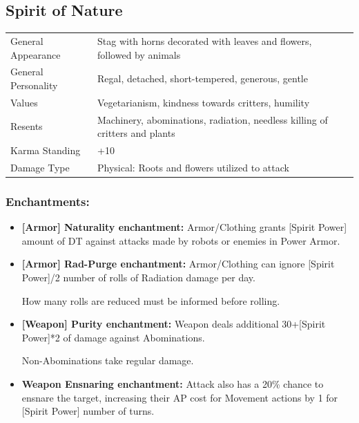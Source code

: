 \documentclass[11pt,a4paper,twocolumn]{book}
\begin{document}
\subsection*{Spirit of Nature}
{
	\begin{tabu} to 75mm{| X[l,4] | X[l,8] |}
		\hline
		General Appearance		& Stag with horns decorated with leaves and flowers, followed by animals		\\
        General Personality	   	& Regal, detached, short-tempered, generous, gentle								\\
        Values     				& Vegetarianism, kindness towards critters, humility							\\
        Resents     			& Machinery, abominations, radiation, needless killing of critters and plants 	\\
        Karma Standing      	& +10																			\\
        Damage Type 			& Physical: Roots and flowers utilized to attack	 							\\ \hline
	\end{tabu}
		
}

\medskip
\subsubsection*{Enchantments:}

\begin{itemize}
	\item \textbf{ [Armor] Naturality enchantment:} Armor/Clothing grants [Spirit Power] amount of DT against attacks made by robots or enemies in Power Armor.
	
    \item \textbf{ [Armor] Rad-Purge enchantment:} Armor/Clothing can ignore [Spirit Power]/2 number of rolls of Radiation damage per day. 
    
    How many rolls are reduced must be informed before rolling.
	
    \item \textbf{ [Weapon] Purity enchantment:} Weapon deals additional 30+[Spirit Power]*2 of damage against Abominations.
	
    Non-Abominations take regular damage.
	
    \item \textbf{Weapon Ensnaring enchantment:} Attack also has a 20\% chance to ensnare the target, increasing their AP cost for Movement actions by 1 for [Spirit Power] number of turns.
\end{itemize}
\end{document}
